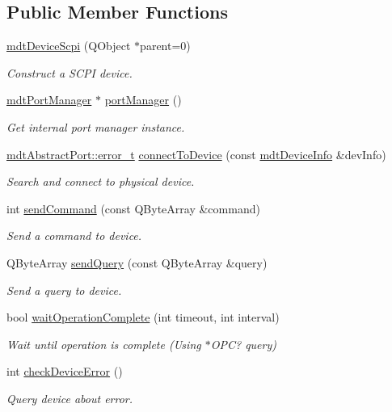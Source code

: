 \subsection*{Public Member Functions}
\begin{DoxyCompactItemize}
\item 
\hyperlink{classmdt_device_scpi_a44c03151a6796e5c1efd64ef55f2d14d}{mdtDeviceScpi} (QObject $\ast$parent=0)
\begin{DoxyCompactList}\small\item\em Construct a SCPI device. \end{DoxyCompactList}\item 
\hypertarget{classmdt_device_scpi_a7dc5ab8856a766a45bcc7e9cba0f54ca}{
\hyperlink{classmdt_port_manager}{mdtPortManager} $\ast$ \hyperlink{classmdt_device_scpi_a7dc5ab8856a766a45bcc7e9cba0f54ca}{portManager} ()}
\label{classmdt_device_scpi_a7dc5ab8856a766a45bcc7e9cba0f54ca}

\begin{DoxyCompactList}\small\item\em Get internal port manager instance. \end{DoxyCompactList}\item 
\hyperlink{classmdt_abstract_port_ad4121bb930c95887e77f8bafa065a85e}{mdtAbstractPort::error\_\-t} \hyperlink{classmdt_device_scpi_ae8e886b362cbf9d1bf7064b48348b8e8}{connectToDevice} (const \hyperlink{classmdt_device_info}{mdtDeviceInfo} \&devInfo)
\begin{DoxyCompactList}\small\item\em Search and connect to physical device. \end{DoxyCompactList}\item 
int \hyperlink{classmdt_device_scpi_ad98f24870f597c31d8788ab4f5bc53fc}{sendCommand} (const QByteArray \&command)
\begin{DoxyCompactList}\small\item\em Send a command to device. \end{DoxyCompactList}\item 
QByteArray \hyperlink{classmdt_device_scpi_a96df8073c8838cc819bf38ed330b076b}{sendQuery} (const QByteArray \&query)
\begin{DoxyCompactList}\small\item\em Send a query to device. \end{DoxyCompactList}\item 
bool \hyperlink{classmdt_device_scpi_aefd45e58d01aed9a165bb2c2dd98198c}{waitOperationComplete} (int timeout, int interval)
\begin{DoxyCompactList}\small\item\em Wait until operation is complete (Using $\ast$OPC? query) \end{DoxyCompactList}\item 
int \hyperlink{classmdt_device_scpi_a65c6f747ac6c6fe727a7359f78139168}{checkDeviceError} ()
\begin{DoxyCompactList}\small\item\em Query device about error. \end{DoxyCompactList}\end{DoxyCompactItemize}

